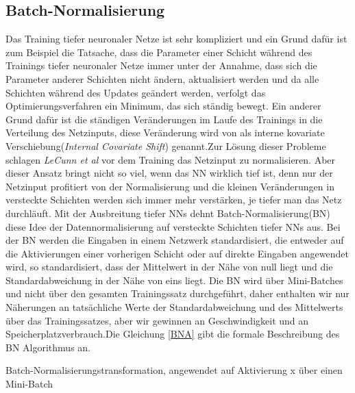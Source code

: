 \documentclass[12pt,a4paper]{scrartcl}
\numberwithin{equation}{section}
\begin{document}
\subsection{Batch-Normalisierung}
Das Training tiefer neuronaler Netze ist sehr kompliziert und ein Grund dafür ist zum Beispiel die Tatsache, dass die Parameter einer Schicht während des Trainings tiefer neuronaler Netze immer unter der Annahme, dass sich die Parameter anderer Schichten nicht ändern, aktualisiert werden und da alle Schichten während des Updates geändert werden, verfolgt das Optimierungsverfahren ein Minimum, das sich ständig bewegt. Ein anderer Grund dafür ist die ständigen Veränderungen im Laufe des Trainings in die Verteilung des Netzinputs, diese Veränderung wird von \cite{bactchnormalisation} als interne kovariate Verschiebung(\textit{Internal Covariate Shift}) genannt.Zur Lösung dieser Probleme schlagen \textit{LeCunn et al}\cite{LeCun} vor dem Training das Netzinput zu normalisieren. Aber dieser Ansatz bringt nicht so viel, wenn das \ac{NN} wirklich tief ist, denn nur der Netzinput profitiert von der Normalisierung und die kleinen Veränderungen in versteckte Schichten werden sich immer mehr verstärken, je tiefer man das Netz durchläuft. Mit der Ausbreitung tiefer \acsp{NN} dehnt Batch-Normalisierung(BN)\cite{bactchnormalisation} diese Idee der Datennormalisierung auf versteckte Schichten tiefer \acsp{NN} aus. Bei der BN werden die Eingaben in einem Netzwerk standardisiert, die entweder auf die Aktivierungen einer vorherigen Schicht oder auf direkte Eingaben angewendet wird, so standardisiert, dass der Mittelwert in der Nähe von null liegt und die Standardabweichung in der Nähe von eins liegt. Die BN wird über Mini-Batches und nicht über den gesamten Trainingssatz durchgeführt, daher enthalten wir nur Näherungen an tatsächliche Werte der Standardabweichung und des Mittelwerts über das Trainingssatzes, aber wir gewinnen an Geschwindigkeit und an Speicherplatzverbrauch.Die Gleichung \eqref{BNA} gibt die formale Beschreibung des BN Algorithmus an.
\begin{center}
	 Batch-Normalisierungstransformation, angewendet auf Aktivierung x über einen Mini-Batch
\end{center}
\end{document}

